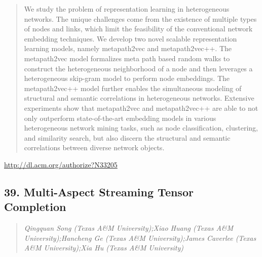 \documentclass{article}
\begin{document}
\begin{quote}
We study the problem of representation learning in heterogeneous networks. The unique challenges come from the existence of multiple types of nodes and links, which limit the feasibility of the conventional network embedding techniques. We develop two novel scalable representation learning models, namely metapath2vec and metapath2vec++. The metapath2vec model formalizes meta path based random walks to construct the heterogeneous neighborhood of a node and then leverages a heterogeneous skip-gram model to perform node embeddings. The metapath2vec++ model further enables the simultaneous modeling of structural and semantic correlations in heterogeneous networks. Extensive experiments show that metapath2vec and metapath2vec++ are able to not only outperform state-of-the-art embedding models in various heterogeneous network mining tasks, such as node classification, clustering, and similarity search, but also discern the structural and semantic correlations between diverse network objects.
\end{quote}

\href{http://dl.acm.org/authorize?N33205}{http://dl.acm.org/authorize?N33205}

\subsection{39. Multi-Aspect Streaming Tensor Completion}

\begin{quote}
\footnotesize{\textit{Qingquan Song (Texas A\&M University);Xiao Huang (Texas A\&M University);Hancheng Ge (Texas A\&M University);James Caverlee (Texas A\&M University);Xia Hu (Texas A\&M University)}}

\end{quote}
\end{document}
